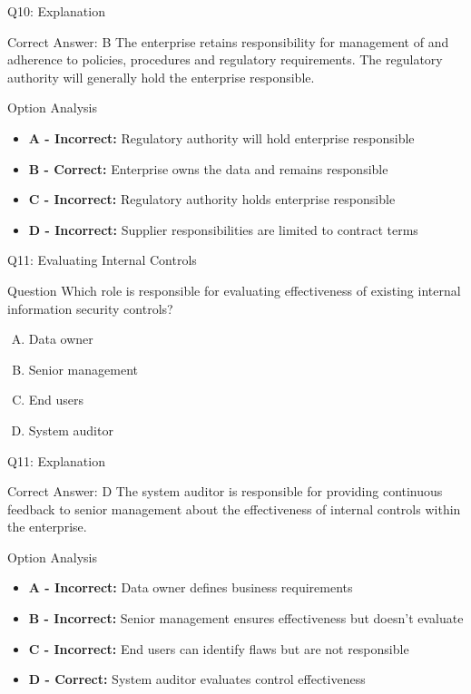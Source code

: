 \documentclass{beamer}
\begin{document}
	\begin{frame}{Q10: Explanation}
		\begin{block}{Correct Answer: B}
			The enterprise retains responsibility for management of and adherence to policies, procedures and regulatory requirements. The regulatory authority will generally hold the enterprise responsible.
		\end{block}
		\begin{block}{Option Analysis}
			\begin{itemize}
				\item \textbf{A - Incorrect:} Regulatory authority will hold enterprise responsible
				\item \textbf{B - Correct:} Enterprise owns the data and remains responsible
				\item \textbf{C - Incorrect:} Regulatory authority holds enterprise responsible
				\item \textbf{D - Incorrect:} Supplier responsibilities are limited to contract terms
			\end{itemize}
		\end{block}
	\end{frame}
	
	\begin{frame}{Q11: Evaluating Internal Controls}
		\begin{block}{Question}
			Which role is responsible for evaluating effectiveness of existing internal information security controls?
		\end{block}
		\begin{enumerate}[(A)]
			\item Data owner
			\item Senior management
			\item End users
			\item System auditor
		\end{enumerate}
	\end{frame}
	
	\begin{frame}{Q11: Explanation}
		\begin{block}{Correct Answer: D}
			The system auditor is responsible for providing continuous feedback to senior management about the effectiveness of internal controls within the enterprise.
		\end{block}
		\begin{block}{Option Analysis}
			\begin{itemize}
				\item \textbf{A - Incorrect:} Data owner defines business requirements
				\item \textbf{B - Incorrect:} Senior management ensures effectiveness but doesn't evaluate
				\item \textbf{C - Incorrect:} End users can identify flaws but are not responsible
				\item \textbf{D - Correct:} System auditor evaluates control effectiveness
			\end{itemize}
		\end{block}
	\end{frame}
	
\end{document}
